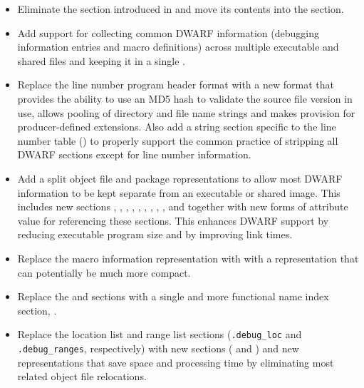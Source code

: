 \begin{itemize}
\item Eliminate the \dotdebugtypes{}
section introduced in \DWARFVersionIV{}
and move its contents into the \dotdebuginfo{} section.
\item Add support for collecting common DWARF information
(debugging information entries and macro definitions)
across multiple executable and shared files and keeping it in a single
.
\item Replace the line number program header format with a new
format that
provides the ability to use an MD5 hash to validate
the source file version in use, allows pooling
of directory and file name strings and makes provision for
\bb
producer-defined
\eb
extensions. Also add a string section specific to the line number table
(\dotdebuglinestr)
to properly support the common practice of stripping all DWARF sections
except for line number information.
\item Add a split object file and package representations to allow most
DWARF information to be kept separate from an executable
or shared image. This includes new sections
\dotdebugaddr, \dotdebugstroffsets, \dotdebugabbrevdwo, \dotdebuginfodwo,
\dotdebuglinedwo, \dotdebugloclistsdwo, \dotdebugmacrodwo, \dotdebugstrdwo,
\dotdebugstroffsetsdwo, \dotdebugcuindex{} and \dotdebugtuindex{}
together with new forms of attribute value for referencing these sections.
This enhances DWARF support by reducing executable program size and
by improving link times.
\item Replace the \dotdebugmacinfo{} macro information representation with
with a \dotdebugmacro{} representation that can potentially be much more compact.
\item Replace the \dotdebugpubnames{} and \dotdebugpubtypes{} sections
with a single and more functional name index section, \dotdebugnames{}.

\item Replace the location list and range list sections (\texttt{.debug\_loc}
and \texttt{.debug\_ranges}, respectively) with new sections (\dotdebugloclists{}
and \dotdebugrnglists) and new representations that
save space and processing time by eliminating most related
object file relocations.


\end{itemize}
